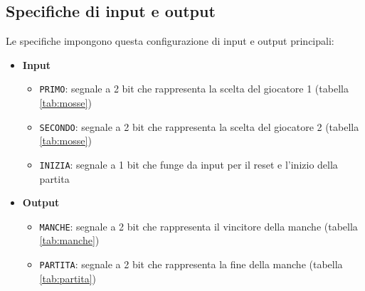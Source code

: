 \documentclass[a4paper]{report}
\begin{document}
\subsection{Specifiche di input e output}
Le specifiche impongono questa configurazione di input e output principali:
\begin{itemize}
    \item \textbf{Input}
    \begin{itemize}
        \item \texttt{PRIMO}: segnale a 2 bit che rappresenta la scelta del giocatore 1 (tabella \ref{tab:mosse})
        \item \texttt{SECONDO}: segnale a 2 bit che rappresenta la scelta del giocatore 2 (tabella \ref{tab:mosse})
        \item \texttt{INIZIA}: segnale a 1 bit che funge da input per il reset e l'inizio della partita
    \end{itemize}
    \item \textbf{Output}
    \begin{itemize}
        \item \texttt{MANCHE}: segnale a 2 bit che rappresenta il vincitore della manche (tabella \ref{tab:manche})
        \item \texttt{PARTITA}: segnale a 2 bit che rappresenta la fine della manche (tabella \ref{tab:partita})
    \end{itemize}
\end{itemize}
\end{document}
